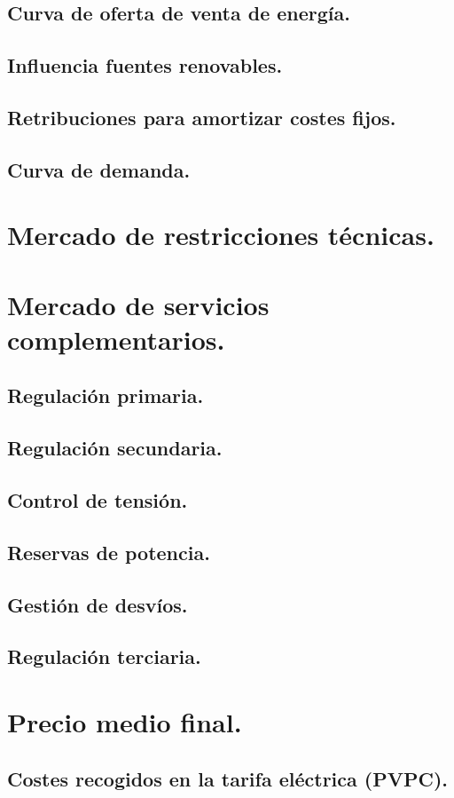 \subsection{Curva de oferta de venta de energía.}
\subsection{Influencia fuentes renovables.}
\subsection{Retribuciones para amortizar costes fijos.}
\subsection{Curva de demanda.}
\section{Mercado de restricciones técnicas.}
\section{Mercado de servicios complementarios.}
\subsection{Regulación primaria.}
\subsection{Regulación secundaria.}
\subsection{Control de tensión.}
\subsection{Reservas de potencia.}
\subsection{Gestión de desvíos.}
\subsection{Regulación terciaria.}
\section{Precio medio final.}
\subsection{Costes recogidos en la tarifa eléctrica (PVPC).}
